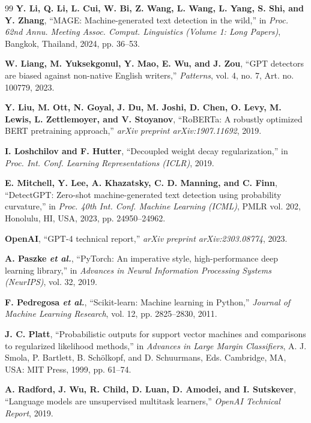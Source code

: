 \begin{thebibliography}{99}
\textbf{Y. Li, Q. Li, L. Cui, W. Bi, Z. Wang, L. Wang, L. Yang, S. Shi, and Y. Zhang}, ``MAGE: Machine-generated text detection in the wild,'' in \textit{Proc. 62nd Annu. Meeting Assoc. Comput. Linguistics (Volume 1: Long Papers)}, Bangkok, Thailand, 2024, pp. 36--53.

\textbf{W. Liang, M. Yuksekgonul, Y. Mao, E. Wu, and J. Zou}, ``GPT detectors are biased against non-native English writers,'' \textit{Patterns}, vol. 4, no. 7, Art. no. 100779, 2023.

\textbf{Y. Liu, M. Ott, N. Goyal, J. Du, M. Joshi, D. Chen, O. Levy, M. Lewis, L. Zettlemoyer, and V. Stoyanov}, ``RoBERTa: A robustly optimized BERT pretraining approach,'' \textit{arXiv preprint arXiv:1907.11692}, 2019.

\textbf{I. Loshchilov and F. Hutter}, ``Decoupled weight decay regularization,'' in \textit{Proc. Int. Conf. Learning Representations (ICLR)}, 2019.

\textbf{E. Mitchell, Y. Lee, A. Khazatsky, C. D. Manning, and C. Finn}, ``DetectGPT: Zero-shot machine-generated text detection using probability curvature,'' in \textit{Proc. 40th Int. Conf. Machine Learning (ICML)}, PMLR vol. 202, Honolulu, HI, USA, 2023, pp. 24950--24962.

\textbf{OpenAI}, ``GPT-4 technical report,'' \textit{arXiv preprint arXiv:2303.08774}, 2023.

\textbf{A. Paszke \textit{et al.}}, ``PyTorch: An imperative style, high-performance deep learning library,'' in \textit{Advances in Neural Information Processing Systems (NeurIPS)}, vol. 32, 2019.

\textbf{F. Pedregosa \textit{et al.}}, ``Scikit-learn: Machine learning in Python,'' \textit{Journal of Machine Learning Research}, vol. 12, pp. 2825--2830, 2011.

\textbf{J. C. Platt}, ``Probabilistic outputs for support vector machines and comparisons to regularized likelihood methods,'' in \textit{Advances in Large Margin Classifiers}, A. J. Smola, P. Bartlett, B. Sch\"{o}lkopf, and D. Schuurmans, Eds. Cambridge, MA, USA: MIT Press, 1999, pp. 61--74.

\textbf{A. Radford, J. Wu, R. Child, D. Luan, D. Amodei, and I. Sutskever}, ``Language models are unsupervised multitask learners,'' \textit{OpenAI Technical Report}, 2019.


\end{thebibliography}
